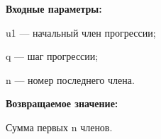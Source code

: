 \textbf{Входные параметры:}  
 
u1 --- начальный член прогрессии;
 
q --- шаг  прогрессии;
 
n --- номер последнего члена.

\textbf{Возвращаемое значение:}
 
Сумма первых n членов.
